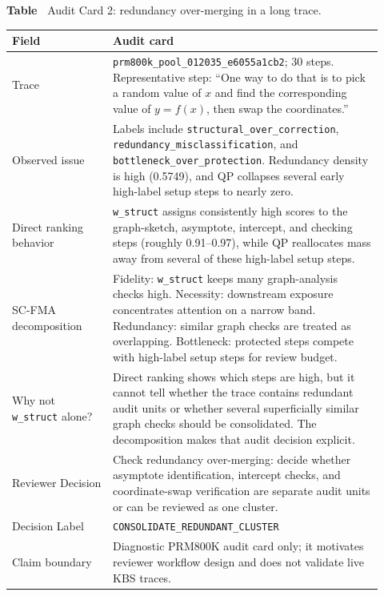 \documentclass[a4paper,fleqn]{cas-sc}
\providecommand{\DIFaddtex}[1]{{\protect\color{blue}\uwave{#1}}} %
\providecommand{\DIFaddbegin}{} %
\providecommand{\DIFaddend}{} %
\providecommand{\DIFdelbegin}{} %
\providecommand{\DIFdelend}{} %
\providecommand{\DIFadd}[1]{\texorpdfstring{\DIFaddtex{#1}}{#1}} %
\providecommand{\DIFscaledelfig}{0.5}
\newlength{\DIFdelgraphicswidth} %
\newlength{\DIFdelgraphicsheight} %
\providecommand{\DIFaddincludegraphics}[2][]{{\color{blue}\fbox{\DIFOincludegraphics[#1]{#2}}}} %
\providecommand{\DIFdelincludegraphics}[2][]{%
\sbox{\DIFdelgraphicsbox}{\DIFOincludegraphics[#1]{#2}}%
\settoboxwidth{\DIFdelgraphicswidth}{\DIFdelgraphicsbox} %
\settoboxtotalheight{\DIFdelgraphicsheight}{\DIFdelgraphicsbox} %
\scalebox{\DIFscaledelfig}{%
\parbox[b]{\DIFdelgraphicswidth}{\usebox{\DIFdelgraphicsbox}\\[-\baselineskip] \rule{\DIFdelgraphicswidth}{0em}}\llap{\resizebox{\DIFdelgraphicswidth}{\DIFdelgraphicsheight}{%
\setlength{\unitlength}{\DIFdelgraphicswidth}%
\begin{picture}(1,1)%
\thicklines\linethickness{2pt} %
{\color[rgb]{1,0,0}\put(0,0){\framebox(1,1){}}}%
{\color[rgb]{1,0,0}\put(0,0){\line( 1,1){1}}}%
{\color[rgb]{1,0,0}\put(0,1){\line(1,-1){1}}}%
\end{picture}%
}\hspace*{3pt}}} %
} %
\DeclareRobustCommand{\DIFaddbegin}{\DIFOaddbegin \let\includegraphics\DIFaddincludegraphics} %
\DeclareRobustCommand{\DIFaddend}{\DIFOaddend \let\includegraphics\DIFOincludegraphics} %
\DeclareRobustCommand{\DIFdelbegin}{\DIFOdelbegin \let\includegraphics\DIFdelincludegraphics} %
\DeclareRobustCommand{\DIFdelend}{\DIFOaddend \let\includegraphics\DIFOincludegraphics} %
\begin{document}
\clearpage
\par\medskip
{}\label{tab:audit-card-redundancy}
\noindent\textbf{Table~\thetable\DIFaddbegin \DIFadd{:}\DIFaddend } \DIFdelbegin %
\DIFdelend Audit Card 2: redundancy over-merging in a long trace.
\begin{center}
\small
\renewcommand{\arraystretch}{1.08}
\begin{tabular}{p{0.25\linewidth}p{0.67\linewidth}}
\toprule
\textbf{Field} & \textbf{Audit card} \\
\midrule
Trace & \texttt{prm800k\_pool\_012035\_e6055a1cb2}; 30 steps. Representative step: ``One way to do that is to pick a random value of $x$ and find the corresponding value of $y=f(x)$, then swap the coordinates.'' \\
Observed issue & Labels include \texttt{structural\_over\_correction}, \texttt{redundancy\_misclassification}, and \texttt{bottleneck\_over\_protection}. Redundancy density is high (0.5749), and QP collapses several early high-label setup steps to nearly zero. \\
Direct ranking behavior & \texttt{w\_struct} assigns consistently high scores to the graph-sketch, asymptote, intercept, and checking steps (roughly 0.91--0.97), while QP reallocates mass away from several of these high-label setup steps. \\
SC-FMA decomposition & Fidelity: \texttt{w\_struct} keeps many graph-analysis checks high. Necessity: downstream exposure concentrates attention on a narrow band. Redundancy: similar graph checks are treated as overlapping. Bottleneck: protected steps compete with high-label setup steps for review budget. \\
Why not \texttt{w\_struct} alone? & Direct ranking shows which steps are high, but it cannot tell whether the trace contains redundant audit units or whether several superficially similar graph checks should be consolidated. The decomposition makes that audit decision explicit. \\
Reviewer Decision & Check redundancy over-merging: decide whether asymptote identification, intercept checks, and coordinate-swap verification are separate audit units or can be reviewed as one cluster. \\
Decision Label & \texttt{CONSOLIDATE\_REDUNDANT\_CLUSTER} \\
Claim boundary & Diagnostic PRM800K audit card only; it motivates reviewer workflow design and does not validate live KBS traces. \\
\bottomrule
\end{tabular}
\end{center}
\medskip
\end{document}
